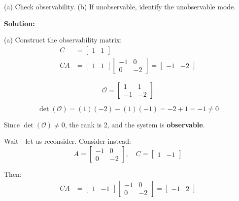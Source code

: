 (a) Check observability. (b) If unobservable, identify the unobservable mode.

\textbf{Solution:}

(a) Construct the observability matrix:
\begin{align}
C &= \begin{bmatrix} 1 & 1 \end{bmatrix} \\
CA &= \begin{bmatrix} 1 & 1 \end{bmatrix} \begin{bmatrix} -1 & 0 \\ 0 & -2 \end{bmatrix} = \begin{bmatrix} -1 & -2 \end{bmatrix}
\end{align}

\begin{equation}
\mathcal{O} = \begin{bmatrix} 1 & 1 \\ -1 & -2 \end{bmatrix}
\end{equation}

\begin{equation}
\det(\mathcal{O}) = (1)(-2) - (1)(-1) = -2 + 1 = -1 \neq 0
\end{equation}

Since $\det(\mathcal{O}) \neq 0$, the rank is 2, and the system is \textbf{observable}.

Wait---let us reconsider. Consider instead:
\begin{equation}
A = \begin{bmatrix} -1 & 0 \\ 0 & -2 \end{bmatrix}, \quad
C = \begin{bmatrix} 1 & -1 \end{bmatrix}
\end{equation}

Then:
\begin{align}
CA &= \begin{bmatrix} 1 & -1 \end{bmatrix} \begin{bmatrix} -1 & 0 \\ 0 & -2 \end{bmatrix} = \begin{bmatrix} -1 & 2 \end{bmatrix}
\end{align}

